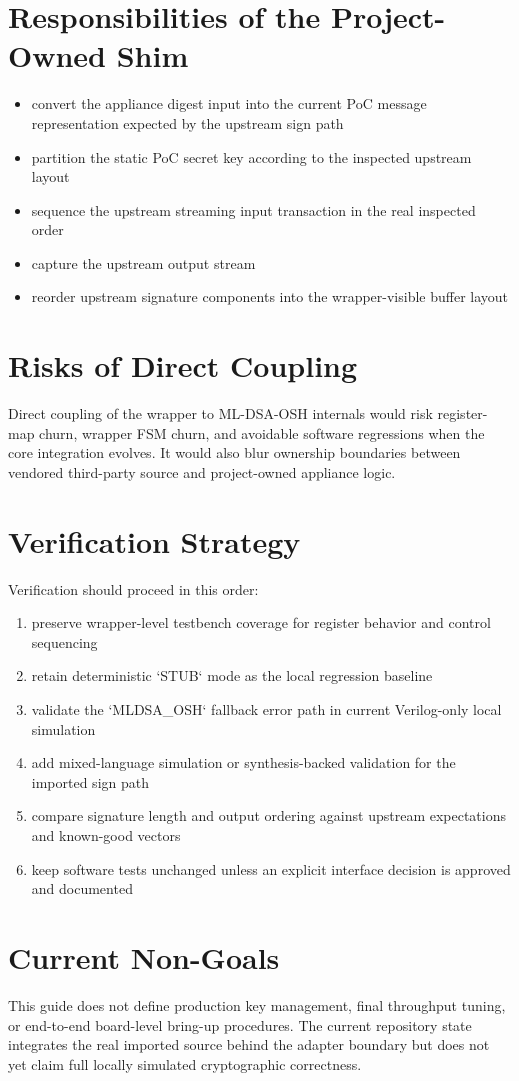 \section{Responsibilities of the Project-Owned Shim}
\begin{itemize}[leftmargin=*]
  \item convert the appliance digest input into the current PoC message representation expected by the upstream sign path
  \item partition the static PoC secret key according to the inspected upstream layout
  \item sequence the upstream streaming input transaction in the real inspected order
  \item capture the upstream output stream
  \item reorder upstream signature components into the wrapper-visible buffer layout
\end{itemize}

\section{Risks of Direct Coupling}
Direct coupling of the wrapper to ML-DSA-OSH internals would risk register-map churn, wrapper FSM churn, and avoidable software regressions when the core integration evolves. It would also blur ownership boundaries between vendored third-party source and project-owned appliance logic.

\section{Verification Strategy}
Verification should proceed in this order:
\begin{enumerate}[leftmargin=*]
  \item preserve wrapper-level testbench coverage for register behavior and control sequencing
  \item retain deterministic `STUB` mode as the local regression baseline
  \item validate the `MLDSA\_OSH` fallback error path in current Verilog-only local simulation
  \item add mixed-language simulation or synthesis-backed validation for the imported sign path
  \item compare signature length and output ordering against upstream expectations and known-good vectors
  \item keep software tests unchanged unless an explicit interface decision is approved and documented
\end{enumerate}

\section{Current Non-Goals}
This guide does not define production key management, final throughput tuning, or end-to-end board-level bring-up procedures. The current repository state integrates the real imported source behind the adapter boundary but does not yet claim full locally simulated cryptographic correctness.